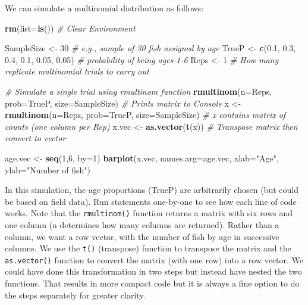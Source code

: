 \documentclass[
]{krantz}
\makeatletter
\newenvironment{Shaded}{\begin{snugshade}}{\end{snugshade}}
\newcommand{\AttributeTok}[1]{\textcolor[rgb]{0.27,0.27,0.27}{#1}}
\newcommand{\CommentTok}[1]{\textcolor[rgb]{0.37,0.37,0.37}{\textit{#1}}}
\newcommand{\DecValTok}[1]{\textcolor[rgb]{0.06,0.06,0.06}{#1}}
\newcommand{\FloatTok}[1]{\textcolor[rgb]{0.06,0.06,0.06}{#1}}
\newcommand{\FunctionTok}[1]{\textcolor[rgb]{0.27,0.27,0.27}{\textbf{#1}}}
\newcommand{\NormalTok}[1]{#1}
\newcommand{\OtherTok}[1]{\textcolor[rgb]{0.37,0.37,0.37}{#1}}
\newcommand{\StringTok}[1]{\textcolor[rgb]{0.5,0.5,0.5}{#1}}
\newenvironment{kframe}{%
\medskip{}
\setlength{\fboxsep}{.8em}
 \def\at@end@of@kframe{}%
 \ifinner\ifhmode%
  \def\at@end@of@kframe{\end{minipage}}%
  \begin{minipage}{\columnwidth}%
 \fi\fi%
 \def\FrameCommand##1{\hskip\@totalleftmargin \hskip-\fboxsep
 \colorbox{shadecolor}{##1}\hskip-\fboxsep
     \hskip-\linewidth \hskip-\@totalleftmargin \hskip\columnwidth}%
 \MakeFramed {\advance\hsize-\width
   \@totalleftmargin\z@ \linewidth\hsize
   \@setminipage}}%
 {\par\unskip\endMakeFramed%
 \at@end@of@kframe}
\renewenvironment{Shaded}{\begin{kframe}}{\end{kframe}}
\makeatother
\begin{document}
We can simulate a multinomial distribution as follows:

\begin{Shaded}
\begin{Highlighting}[]
\FunctionTok{rm}\NormalTok{(}\AttributeTok{list=}\FunctionTok{ls}\NormalTok{()) }\CommentTok{\# Clear Environment}

\NormalTok{SampleSize }\OtherTok{\textless{}{-}} \DecValTok{30}  \CommentTok{\# e.g., sample of 30 fish assigned by age}
\NormalTok{TrueP }\OtherTok{\textless{}{-}} \FunctionTok{c}\NormalTok{(}\FloatTok{0.1}\NormalTok{, }\FloatTok{0.3}\NormalTok{, }\FloatTok{0.4}\NormalTok{, }\FloatTok{0.1}\NormalTok{, }\FloatTok{0.05}\NormalTok{, }\FloatTok{0.05}\NormalTok{) }\CommentTok{\# probability of being ages 1{-}6}
\NormalTok{Reps }\OtherTok{\textless{}{-}} \DecValTok{1} \CommentTok{\# How many replicate multinomial trials to carry out}

\CommentTok{\# Simulate a single trial using rmultinom function}
\FunctionTok{rmultinom}\NormalTok{(}\AttributeTok{n=}\NormalTok{Reps, }\AttributeTok{prob=}\NormalTok{TrueP, }\AttributeTok{size=}\NormalTok{SampleSize) }\CommentTok{\# Prints matrix to Console}
\NormalTok{x }\OtherTok{\textless{}{-}} \FunctionTok{rmultinom}\NormalTok{(}\AttributeTok{n=}\NormalTok{Reps, }\AttributeTok{prob=}\NormalTok{TrueP, }\AttributeTok{size=}\NormalTok{SampleSize)}
\CommentTok{\# x contains matrix of counts (one column per Rep)}
\NormalTok{x.vec }\OtherTok{\textless{}{-}} \FunctionTok{as.vector}\NormalTok{(}\FunctionTok{t}\NormalTok{(x)) }\CommentTok{\# Transpose matrix then convert to vector}

\NormalTok{age.vec }\OtherTok{\textless{}{-}} \FunctionTok{seq}\NormalTok{(}\DecValTok{1}\NormalTok{,}\DecValTok{6}\NormalTok{, }\AttributeTok{by=}\DecValTok{1}\NormalTok{)}
\FunctionTok{barplot}\NormalTok{(x.vec, }\AttributeTok{names.arg=}\NormalTok{age.vec, }\AttributeTok{xlab=}\StringTok{"Age"}\NormalTok{, }\AttributeTok{ylab=}\StringTok{"Number of fish"}\NormalTok{)}
\end{Highlighting}
\end{Shaded}

In this simulation, the age proportions (TrueP) are arbitrarily chosen (but could be based on field data). Run statements one-by-one to see how each line of code works. Note that the \texttt{rmultinom()} function returns a matrix with six rows and one column (n determines how many columns are returned). Rather than a column, we want a row vector, with the number of fish by age in successive columns. We use the \texttt{t()} (transpose) function to transpose the matrix and the \texttt{as.vector()} function to convert the matrix (with one row) into a row vector. We could have done this transformation in two steps but instead have nested the two functions. That results in more compact code but it is always a fine option to do the steps separately for greater clarity.
\end{document}
